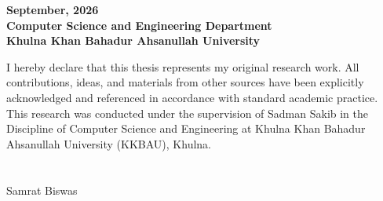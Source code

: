 \begin{center}
\large
\textbf{September, 2026}\\
\textbf{Computer Science and Engineering Department}\\
\textbf{Khulna Khan Bahadur Ahsanullah University}\\

\end{center}


I hereby declare that this thesis represents my original research work. All contributions, ideas, and materials from other sources have been explicitly acknowledged and referenced in accordance with standard academic practice. This research was conducted under the supervision of Sadman Sakib in the Discipline of Computer Science and Engineering at Khulna Khan Bahadur Ahsanullah University (KKBAU), Khulna.\\ 
\vspace{72pt}\\
\hspace{0.5cm} \makebox[2in]{\hrulefill}\\ Samrat Biswas\\
